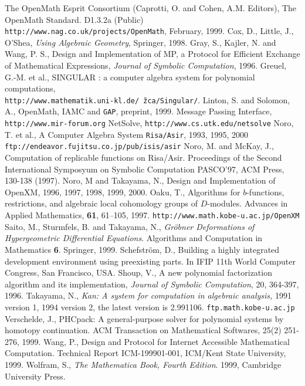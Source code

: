 
\begin{thebibliography}{X}
The OpenMath Esprit Consortium 
(Caprotti, O. and Cohen, A.M. Editors),
The OpenMath Standard. D1.3.2a (Public) \\
{\footnotesize \tt http://www.nag.co.uk/projects/OpenMath},
February, 1999.
Cox, D., Little, J.,  O'Shea,
{\it Using Algebraic Geometry}, Springer, 1998.
Gray, S., Kajler, N. and Wang, P. S.,
Design and Implementation of MP, a Protocol for Efficient
  Exchange of Mathematical Expressions,
{\sl Journal of Symbolic Computation}, 1996.
Greuel, G.-M. et al., SINGULAR : a computer algebra system for polynomial
computations, \\
{\tt http://www.mathematik.uni-kl.de/\~\,zca/Singular/}.
Linton, S. and Solomon, A.,
OpenMath, IAMC and {\tt GAP},
preprint, 1999.
 Message Passing Interface,
{\tt http://www.mir-forum.org} 
NetSolve, {\tt http://www.cs.utk.edu/netsolve}
Noro, T. et al., 
A Computer Algebra System {\tt Risa/Asir},  1993, 1995, 2000\\
{\tt ftp://endeavor.fujitsu.co.jp/pub/isis/asir}
Noro, M. and McKay, J.,
Computation of replicable functions on Risa/Asir.
Proceedings of the Second International Symposyum on
Symbolic Computation PASCO'97, ACM Press, 130-138 (1997).
Noro, M and Takayama, N., Design and Implementation
of OpenXM, 1996, 1997, 1998, 1999, 2000.
Oaku, T.,
Algorithms for $b$-functions, restrictions, and algebraic local cohomology
groups of $D$-modules.
Advances in Applied Mathematics, {\bf 61}, 61--105, 1997.
{\footnotesize {\tt http://www.math.kobe-u.ac.jp/OpenXM}}
Saito, M., Sturmfels, B. and Takayama, N.,
{\it Gr\"obner Deformations of Hypergeometric Differential Equations}.
Algorithms and Computation in Mathematics {\bf 6}. Springer, 1999.
Schefstr\"om, D.,
Building a highly integrated development environment using
preexisting parts.
In IFIP 11th World Computer Congress, San Francisco, USA.
Shoup, V., 
A new polynomial factorization algorithm and 
its implementation,
{\sl Journal of Symbolic Computation}, 20, 364-397, 1996.
	Takayama, N.,
	{\em Kan: A system for computation in
	algebraic analysis,} 1991 version 1,
        1994 version 2, the latest version is 2.991106. 
	{\tt \small ftp.math.kobe-u.ac.jp}
Verschelde, J.,
PHCpack: A general-purpose solver for polynomial systems by
homotopy continuation.  ACM Transaction on Mathematical Softwares, 25(2) 
251-276, 1999.
Wang, P.,
Design and Protocol for Internet Accessible Mathematical Computation.
Technical Report ICM-199901-001, ICM/Kent State University, 1999.
Wolfram, S.,
{\it The Mathematica Book, Fourth Edition}.
1999, Cambridge University Press.
\end{thebibliography}
